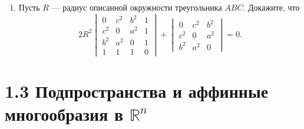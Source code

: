 \begin{enumerate}
\begin{enumerate}
			\item
			\[
				V^2 = \frac{1}{288} \begin{vmatrix}
					0 & c_1^2 & b_1^2 & a^2 & 1 \\
					c_1^2 & 0 & a_1^2 & b^2 & 1 \\
					b_1^2 & a_1^2 & 0 & c^2 & 1 \\
					a^2 & b^2 & c^2 & 0 & 1 \\
					1 & 1 & 1 & 1 & 0
				\end{vmatrix}.
			\]
		\end{enumerate}
		\item Пусть $R$ — радиус описанной окружности треугольника $ABC$. Докажите, что
		\[ 
			2R^2 \begin{vmatrix}
				0 & c^2 & b^2 & 1 \\
				c^2 & 0 & a^2 & 1 \\
				b^2 & a^2 & 0 & 1 \\
				1 & 1 & 1 & 0
			\end{vmatrix} + \begin{vmatrix}
				0 & c^2 & b^2 \\
				c^2 & 0 & a^2 \\
				b^2 & a^2 & 0
			\end{vmatrix} = 0.
		\]
	\end{enumerate}
	\newpage

	\section{1.3 Подпространства и аффинные многообразия в $\mathbb{R}^n$}

